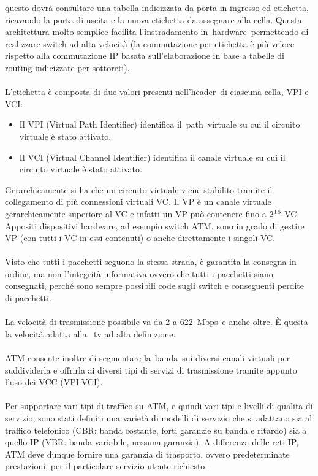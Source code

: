 \documentclass{article}
\begin{document}
questo dovrà consultare una tabella indicizzata da porta in ingresso ed etichetta, ricavando la porta di 
uscita e la nuova etichetta da assegnare alla cella. Questa architettura molto semplice facilita 
l'instradamento in hardware permettendo di realizzare switch ad alta velocità (la commutazione 
per etichetta è più veloce rispetto alla commutazione IP basata sull'elaborazione in base a tabelle di 
routing indicizzate per sottoreti).\\\\
L'etichetta è composta di due valori presenti nell'header di ciascuna cella, VPI e VCI:\\
\begin{itemize}
    \item Il VPI (Virtual Path Identifier) identifica il path virtuale su cui il circuito virtuale è stato attivato.
    \item Il VCI (Virtual Channel Identifier) identifica il canale virtuale su cui il circuito virtuale è stato attivato.
\end{itemize}
\noindent
Gerarchicamente si ha che un circuito virtuale viene stabilito tramite il collegamento di più connessioni 
virtuali VC. Il VP è un canale virtuale gerarchicamente superiore al VC e infatti un VP può contenere 
fino a $2\textsuperscript{16}$ VC. Appositi dispositivi hardware, ad esempio switch ATM, sono in grado di gestire VP 
(con tutti i VC in essi contenuti) o anche direttamente i singoli VC.\\\\
Visto che tutti i pacchetti seguono la stessa strada, è garantita la consegna in ordine, ma non l'integrità 
informativa ovvero che tutti i pacchetti siano consegnati, perché sono sempre possibili code sugli switch 
e conseguenti perdite di pacchetti.\\\\
La velocità di trasmissione possibile va da 2 a 622 Mbps e anche oltre. È questa la velocità adatta alla 
tv ad alta definizione.\\\\
ATM consente inoltre di segmentare la banda sui diversi canali virtuali per suddividerla e offrirla ai 
diversi tipi di servizi di trasmissione tramite appunto l'uso dei VCC (VPI:VCI).\\\\
Per supportare vari tipi di traffico su ATM, e quindi vari tipi e livelli di qualità di servizio, 
sono stati definiti una varietà di modelli di servizio che si adattano sia al traffico telefonico 
(CBR: banda costante, forti garanzie su banda e ritardo) sia a quello IP (VBR: banda variabile, nessuna 
garanzia). A differenza delle reti IP, ATM deve dunque fornire una garanzia di trasporto, ovvero 
predeterminate prestazioni, per il particolare servizio utente richiesto.
\end{document}
